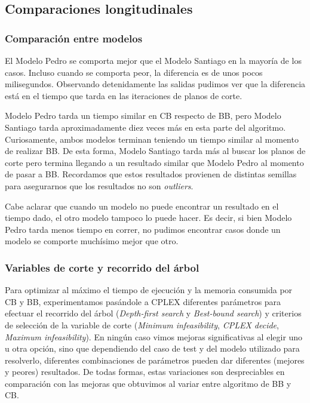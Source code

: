 \documentclass[a4paper, 10pt, twoside]{article}
\begin{document}
\subsection{Comparaciones longitudinales}

\subsubsection{Comparación entre modelos}

El Modelo Pedro se comporta mejor que el Modelo Santiago en la mayoría de los casos. Incluso cuando se comporta peor, la diferencia es de unos pocos milisegundos. Observando detenidamente las salidas pudimos ver que la diferencia está en el tiempo que tarda en las iteraciones de planos de corte.

Modelo Pedro tarda un tiempo similar en CB respecto de BB, pero Modelo Santiago tarda aproximadamente diez veces más en esta parte del algoritmo. Curiosamente, ambos modelos terminan teniendo un tiempo similar al momento de realizar BB. De esta forma, Modelo Santiago tarda más al buscar los planos de corte pero termina llegando a un resultado similar que Modelo Pedro al momento de pasar a BB. Recordamos que estos resultados provienen de distintas semillas para asegurarnos que los resultados no son \textit{outliers}.

Cabe aclarar que cuando un modelo no puede encontrar un resultado en el tiempo dado, el otro modelo tampoco lo puede hacer. Es decir, si bien Modelo Pedro tarda menos tiempo en correr, no pudimos encontrar casos donde un modelo se comporte muchísimo mejor que otro.

\subsubsection{Variables de corte y recorrido del árbol}
Para optimizar al máximo el tiempo de ejecución y la memoria consumida por CB y BB, experimentamos pasándole a CPLEX diferentes parámetros para efectuar el recorrido del árbol (\emph{Depth-first search} y \emph{Best-bound search}) y criterios de selección de la variable de corte (\emph{Minimum infeasibility}, \emph{CPLEX decide}, \emph{Maximum infeasibility}). En ningún caso vimos mejoras significativas al elegir uno u otra opción, sino que dependiendo del caso de test y del modelo utilizado para resolverlo, diferentes combinaciones de parámetros pueden dar diferentes (mejores y peores) resultados. De todas formas, estas variaciones son despreciables en comparación con las mejoras que obtuvimos al variar entre algoritmo de BB y CB.
\end{document}
